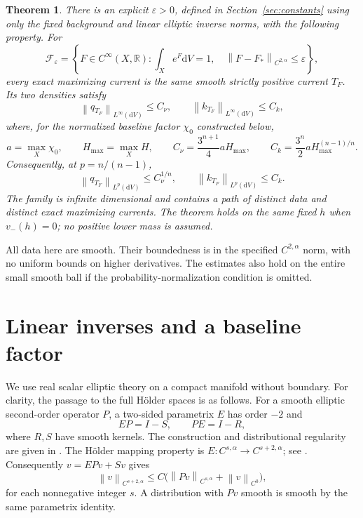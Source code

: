 \documentclass[11pt]{article}
\newtheorem{theorem}{Theorem}[section]
\newcommand{\eps}{\varepsilon}
\newcommand{\norm}[1]{\left\|#1\right\|}
\begin{document}
\begin{theorem}\label{thm:endpoint}
There is an explicit $\eps>0$, defined in Section~\ref{sec:constants}
using only the fixed background and linear elliptic inverse norms, with
the following property. For
\[
 \mathcal F_\eps=\left\{F\in C^\infty(X,\mathbb R):
       \int_Xe^F\mathrm dV=1,\quad
       \norm{F-F_*}_{C^{2,\alpha}}\le\eps\right\},
\]
every exact maximizing current is the same smooth strictly positive
current $T_F$. Its two densities satisfy
\[
 \norm{q_{T_F}}_{L^\infty(\mathrm dV)}\le C_\nu,
 \qquad \norm{k_{T_F}}_{L^\infty(\mathrm dV)}\le C_k,
\]
where, for the normalized baseline factor $\chi_0$ constructed below,
\[
 a=\max_X\chi_0,\qquad H_{\max}=\max_XH,
 \qquad C_\nu=\frac{3^{n+1}}4aH_{\max},
 \qquad C_k=\frac{3^n}2aH_{\max}^{(n-1)/n}.
\]
Consequently, at $p=n/(n-1)$,
\[
 \norm{q_{T_F}}_{L^p(\mathrm dV)}\le C_\nu^{1/n},
 \qquad \norm{k_{T_F}}_{L^p(\mathrm dV)}\le C_k.
\]
The family is infinite dimensional and contains a path of distinct data
and distinct exact maximizing currents. The theorem holds on the same
fixed $h$ when $v_-(h)=0$; no positive lower mass is assumed.
\end{theorem}

All data here are smooth. Their boundedness is in the specified
$C^{2,\alpha}$ norm, with no uniform bounds on higher derivatives.
The estimates also hold on the entire small smooth ball if the
probability-normalization condition is omitted.

\section{Linear inverses and a baseline factor}\label{sec:linear}

We use real scalar elliptic theory on a compact manifold without boundary.
For clarity, the passage to the full H\"older spaces is as follows.
For a smooth elliptic second-order operator $P$, a two-sided parametrix
$E$ has order $-2$ and
\[
 EP=I-S,\qquad PE=I-R,
\]
where $R,S$ have smooth kernels. The construction and distributional
regularity are given in \cite[Chapter 7, Sections 4 and 10]{Taylor7}.
The H\"older mapping property is
$E:C^{s,\alpha}\longrightarrow C^{s+2,\alpha}$;
see \cite[Chapter 13, Section 8, particularly (8.7), (8.17) and
(8.22)]{Taylor13}. Consequently $v=EPv+Sv$ gives
\[
 \norm{v}_{C^{s+2,\alpha}}
  \le C\bigl(\norm{Pv}_{C^{s,\alpha}}+\norm{v}_{C^0}\bigr),
\]
for each nonnegative integer $s$. A distribution with $Pv$ smooth is
smooth by the same parametrix identity.
\end{document}
